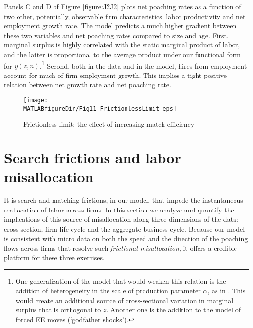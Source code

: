 Panels C and D of Figure \ref{figure:J2J2} plots net poaching rates as a function of two other, potentially, observable firm characteristics, labor productivity and net employment growth rate.
The model predicts a much higher gradient between these two variables and net poaching rates compared to size and age.
First, marginal surplus is highly correlated with the static marginal product of labor, and the latter is proportional to the average product under our functional form for $y(z,n)$.\footnote{
    One generalization of the model that would weaken this relation is the addition of heterogeneity in the scale of production parameter $\alpha$, as in \citet{Gavazza2018}.
    This would create an additional source of cross-sectional variation in marginal surplus that is orthogonal to $z$. Another one is the addition to the model of forced EE moves (`godfather shocks').}
Second, both in the data and in the model, hires from employment account for much of firm employment growth.
This implies a tight positive relation between net growth rate and net poaching rate.

\begin{figure}[ttt]
\begin{center}
\texttt{[image: \\MATLABfigureDir/Fig11\_FrictionlessLimit\_eps]}\vspace*{-.3cm}
\caption{Frictionless limit: the effect of increasing match efficiency}\label{figure:Hopenhayn}\vspace*{-.6cm}
\end{center}
\end{figure}

\section{Search frictions and labor misallocation}\label{sec:misallocation}

It is search and matching frictions, in our model, that impede the instantaneous reallocation of labor across firms. In this section we analyze and quantify the implications of this source of misallocation along three dimensions of the data: cross-section, firm life-cycle and the aggregate business cycle. Because our model is consistent with micro data on both the speed and the direction of the poaching flows across firms that resolve such \textit{frictional misallocation}, it offers a credible platform for these three exercises.

